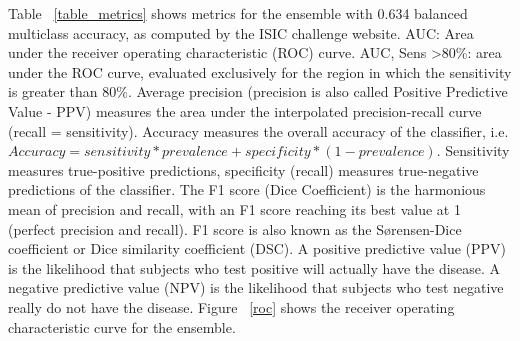 \documentclass[journal]{IEEEtran}
\begin{document}
Table ~\ref{table_metrics} shows metrics for the ensemble with 0.634 balanced multiclass accuracy, as computed by the ISIC challenge website. AUC: Area under the receiver operating characteristic (ROC) curve. AUC, Sens \textgreater 80\%: area under the ROC curve, evaluated exclusively for the region in which the sensitivity is greater than 80\%. Average precision (precision is also called Positive Predictive Value - PPV) measures the area under the interpolated precision-recall curve (recall = sensitivity). Accuracy measures the overall accuracy of the classifier, i.e.
$ Accuracy = sensitivity * prevalence + specificity * (1-prevalence) $.
Sensitivity measures true-positive predictions, specificity (recall) measures true-negative predictions of the classifier. The F1 score (Dice Coefficient) is the harmonious mean of precision and recall, with an F1 score reaching its best value at 1 (perfect precision and recall). F1 score is also known as the Sørensen-Dice coefficient or Dice similarity coefficient (DSC). A positive predictive value (PPV) is the likelihood that subjects who test positive will actually have the disease. A negative predictive value (NPV) is the likelihood that subjects who test negative really do not have the disease. Figure ~\ref{roc} shows the receiver operating characteristic curve for the ensemble.
\end{document}
